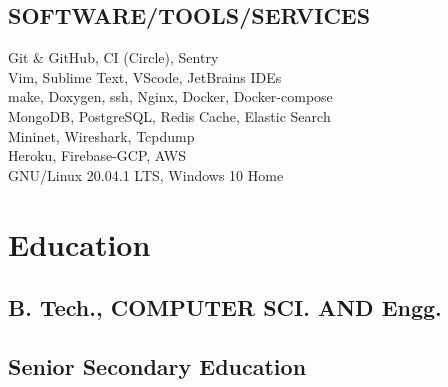 \documentclass[letterpaper]{deedy-resume} %
\begin{document}
\begin{minipage}[t]{0.33\textwidth}
\subsection{SOFTWARE/TOOLS/SERVICES}
Git \& GitHub, CI (Circle), Sentry \\
Vim, Sublime Text, VScode, JetBrains IDEs \\
make, Doxygen, ssh, Nginx, Docker, Docker-compose \\
MongoDB, PostgreSQL, Redis Cache, Elastic Search \\
Mininet, Wireshark, Tcpdump \\
Heroku, Firebase-GCP, AWS \\
GNU/Linux 20.04.1 LTS, Windows 10 Home


\sectionspace %


\section{Education} 


\subsection{B. Tech., COMPUTER SCI. AND Engg. }

\sectionspace %

\subsection{Senior Secondary Education}






\end{minipage}
\end{document}
